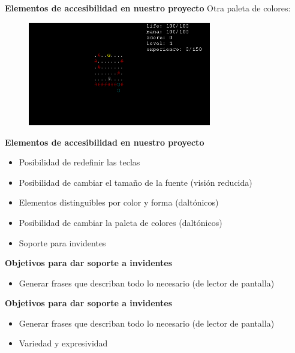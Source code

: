 \begin{tframe}{\textbf{Elementos de accesibilidad en nuestro proyecto}}
	Otra paleta de colores:
		\begin{figure}[h]
			\includegraphics[width=8cm]{../img/paletaColores2.PNG}
		\end{figure}
\end{tframe}

\begin{tframe}{\textbf{Elementos de accesibilidad en nuestro proyecto}}
	\begin{itemize}
		\item Posibilidad de redefinir las teclas
		\item Posibilidad de cambiar el tamaño de la fuente (visión reducida)
		\item Elementos distinguibles por color y forma (daltónicos)
		\item Posibilidad de cambiar la paleta de colores (daltónicos)
		\item<+-| alert@+> Soporte para invidentes
	\end{itemize}
\end{tframe}


\begin{tframe}{\textbf{Objetivos para dar soporte a invidentes}}
	\begin{itemize}
		\item<+-| alert@+> Generar frases que describan todo lo necesario (de lector de pantalla)
	\end{itemize}
\end{tframe}

\begin{tframe}{\textbf{Objetivos para dar soporte a invidentes}}
	\begin{itemize}
		\item Generar frases que describan todo lo necesario (de lector de pantalla)
		\item<+-| alert@+> Variedad y expresividad
	\end{itemize}
\end{tframe}

